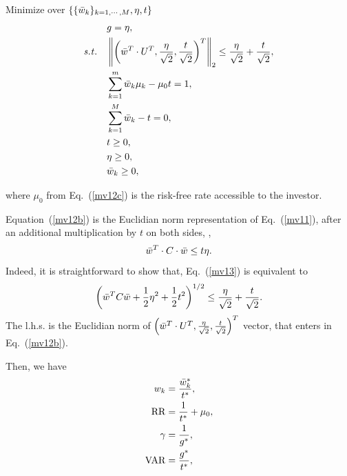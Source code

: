 \bigskip
\noindent Minimize over $\{ \{ {\bar w}_k\}_{k=1,\cdots,M}, \eta, t\}$
\begin{subequations}\label{mv12}
\begin{align}
    & g = \eta, \label{mv12a} \\
    \st & \left\| \left( \bw^T \cdot U^T , \frac{\eta}{\sqrt{2}} , \frac{t}{\sqrt{2}}  \right)^T \right\|_2
                \leq \frac{\eta}{\sqrt{2}}  + \frac{t}{\sqrt{2}} , \label{mv12b} \\
        & \sum_{k=1}^m \bw_k \mu_k - \mu_0 t = 1, \label{mv12c} \\
        & \sum_{k=1}^M \bw_k - t = 0, \label{mv12d} \\
        &t \geq 0, \label{mv12e} \\
        &\eta \geq 0, \label{mv12f} \\
        &\bw_k \geq 0, \label{mv12g}
 \end{align}
\end{subequations}

\noindent where $\mu_0$ from Eq.~(\ref{mv12c}) is the risk-free rate accessible to the investor.

Equation~(\ref{mv12b}) is the Euclidian norm representation of Eq.~(\ref{mv11}), after
an additional multiplication by $t$ on both sides, \ie,
\begin{equation}
    \bw^T\cdot C\cdot \bw \leq t\eta.
    \label{mv13}
\end{equation}
Indeed, it is straightforward to show that, Eq.~(\ref{mv13}) is equivalent to
\begin{equation}
    \left( \bw^T C \bw + \frac{1}{2}\eta^2 + \frac{1}{2}t^2 \right)^{1/2} \leq \frac{\eta}{\sqrt{2}} + \frac{t}{\sqrt{2}}.
    \label{mv14}
\end{equation}
The l.h.s. is the Euclidian norm of $\left( {\bar w}^T \cdot U^T , \frac{\eta}{\sqrt{2}} , \frac{t}{\sqrt{2}}  \right)^T$ vector, that
enters in Eq.~(\ref{mv12b}).

Then, we have
\begin{subequations}\label{mv15}
\begin{align}
    w_k &= \frac{\bw_k^*}{t^*}, \label{mv15a} \\
    \RR &= \frac{1}{t^*} + \mu_0, \label{mv15c} \\
    \Sharpe &= \frac{1}{g^*}, \label{mv15b} \\
    \VAR &= \frac{g^*}{t^*}, \label{mv15d}
 \end{align}
\end{subequations}

